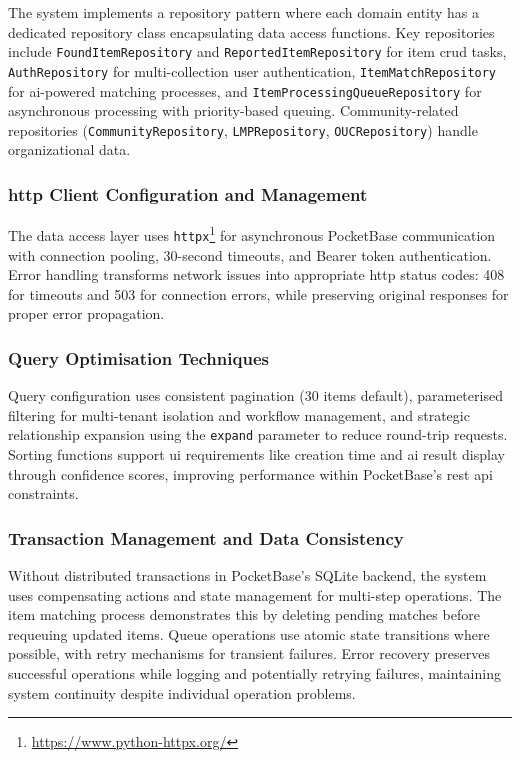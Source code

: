 The system implements a repository pattern where each domain entity has a dedicated repository class encapsulating data access functions. Key repositories include \texttt{FoundItemRepository} and \texttt{ReportedItemRepository} for item \ac{crud} tasks, \texttt{AuthRepository} for multi-collection user authentication, \texttt{ItemMatchRepository} for \ac{ai}-powered matching processes, and \texttt{ItemProcessingQueueRepository} for asynchronous processing with priority-based queuing. Community-related repositories (\texttt{CommunityRepository}, \texttt{LMPRepository}, \texttt{OUCRepository}) handle organizational data.

\subsubsection{\acs{http} Client Configuration and Management}

The data access layer uses \texttt{httpx}\footnote{\url{https://www.python-httpx.org/}} for asynchronous PocketBase communication with connection pooling, 30-second timeouts, and Bearer token authentication. Error handling transforms network issues into appropriate \ac{http} status codes: 408 for timeouts and 503 for connection errors, while preserving original responses for proper error propagation.

\subsubsection{Query Optimisation Techniques}

Query configuration uses consistent pagination (30 items default), parameterised filtering for multi-tenant isolation and workflow management, and strategic relationship expansion using the \texttt{expand} parameter to reduce round-trip requests. Sorting functions support \ac{ui} requirements like creation time and \ac{ai} result display through confidence scores, improving performance within PocketBase's \ac{rest} \ac{api} constraints.


\subsubsection{Transaction Management and Data Consistency}

Without distributed transactions in PocketBase's SQLite backend, the system uses compensating actions and state management for multi-step operations. The item matching process demonstrates this by deleting pending matches before requeuing updated items. Queue operations use atomic state transitions where possible, with retry mechanisms for transient failures. Error recovery preserves successful operations while logging and potentially retrying failures, maintaining system continuity despite individual operation problems.

